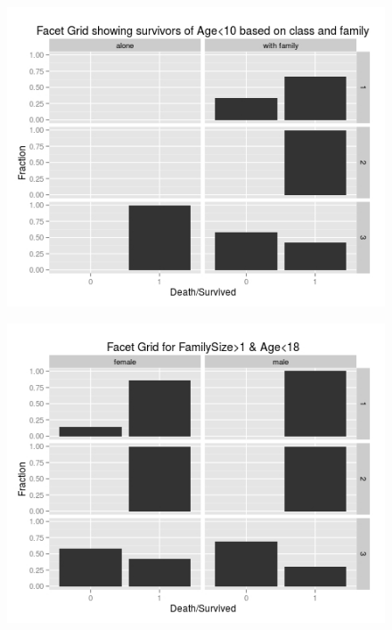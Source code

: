 \begin{figure}
\centering
\begin{minipage}{.5\textwidth}
  \centering
  \includegraphics[width=1\linewidth]{figs/plot1}
  \label{fig:plot1}
\end{minipage}%
\begin{minipage}{.5\textwidth}
  \centering
  \includegraphics[width=1\linewidth]{figs/plot6}
  \label{fig:plot6}
\end{minipage}
\end{figure}

